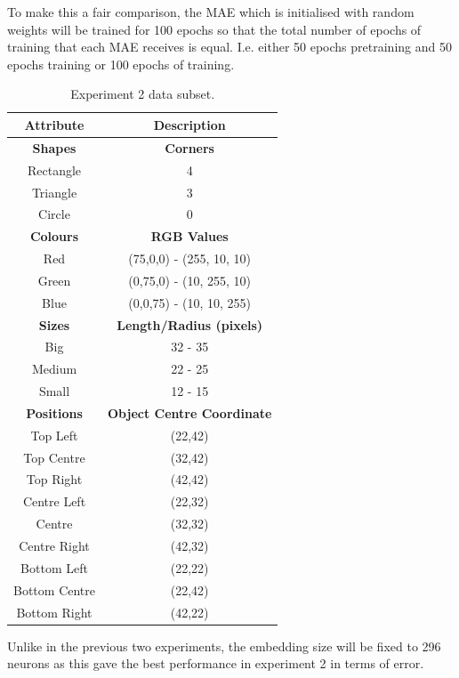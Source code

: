 To make this a fair comparison, the MAE which is initialised with random weights will be trained for 100 epochs so that the total number of epochs of training that each MAE receives is equal. I.e. either 50 epochs pretraining and 50 epochs training or 100 epochs of training.


\begin{table}[h]
\centering
\begin{tabular}{|c|c|}
\hline
\textbf{Attribute} & \textbf{Description} \\ \hline \hline
\textbf{Shapes} & \textbf{Corners} \\ \hline
Rectangle & 4\\ \hline
Triangle & 3\\ \hline
Circle & 0\\ \hline 

\textbf{Colours} & \textbf{RGB Values}	\\ \hline	
Red & (75,0,0) - (255, 10, 10)\\ \hline
Green  & (0,75,0) - (10, 255, 10)\\ \hline
Blue   & (0,0,75) - (10, 10, 255)\\ \hline

\textbf{Sizes} & 	\textbf{Length/Radius (pixels)} \\ \hline			  
Big    & 32 - 35  \\ \hline
Medium & 22 - 25 \\ \hline
Small  & 12 - 15 \\ \hline 

\textbf{Positions} & \textbf{Object Centre Coordinate}	\\ \hline					  
Top Left & (22,42)\\ \hline	
Top Centre & (32,42)\\ \hline
Top Right & (42,42)\\ \hline
Centre Left &(22,32)\\ \hline
Centre & (32,32)\\ \hline
Centre Right &(42,32)\\ \hline
Bottom Left & (22,22)\\ \hline
Bottom Centre & (22,42)\\ \hline
Bottom Right & (42,22)\\ \hline				
\end{tabular}
\caption{Experiment 2 data subset.}
\label{tab:exp3_data} 
\end{table}

Unlike in the previous two experiments, the embedding size will be fixed to 296 neurons as this gave the best performance in experiment 2 in terms of error.

